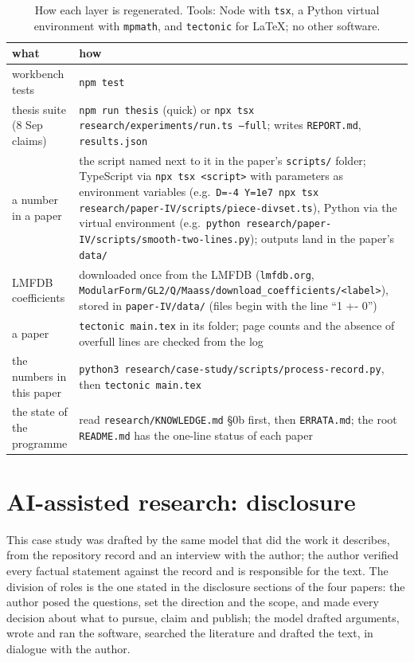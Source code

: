 \documentclass[11pt,a4paper]{article}
\begin{document}
\begin{table}[htbp]
\centering\small
\caption{How each layer is regenerated. Tools: Node with \texttt{tsx}, a Python virtual environment with
\texttt{mpmath}, and \texttt{tectonic} for \LaTeX; no other software.}\label{tab:regen}
\begin{tabular}{@{}>{\raggedright\arraybackslash}p{4.2cm}>{\raggedright\arraybackslash}p{10.4cm}@{}}
\toprule
what & how\\
\midrule
workbench tests & \texttt{npm test}\\
thesis suite (8 Sep claims) & \texttt{npm run thesis} (quick) or \texttt{npx tsx research/experiments/run.ts --full};
writes \texttt{REPORT.md}, \texttt{results.json}\\
a number in a paper & the script named next to it in the paper's \texttt{scripts/} folder; TypeScript via
\texttt{npx tsx <script>} with parameters as environment variables (e.g.\ \texttt{D=-4 Y=1e7 npx tsx
research/paper-IV/scripts/piece-divset.ts}), Python via the virtual environment (e.g.\ \texttt{python
research/paper-IV/scripts/smooth-two-lines.py}); outputs land in the paper's \texttt{data/}\\
LMFDB coefficients & downloaded once from the LMFDB (\texttt{lmfdb.org}, \texttt{ModularForm/GL2/Q/Maass/}\allowbreak\texttt{download\_coefficients/<label>}),
stored in \texttt{paper-IV/data/} (files begin with the line ``1 +- 0'')\\
a paper & \texttt{tectonic main.tex} in its folder; page counts and the absence of overfull lines are checked from the
log\\
the numbers in this paper & \texttt{python3 research/case-study/scripts/process-record.py}, then \texttt{tectonic main.tex}\\
the state of the programme & read \texttt{research/KNOWLEDGE.md} \S0b first, then \texttt{ERRATA.md}; the root
\texttt{README.md} has the one-line status of each paper\\
\bottomrule
\end{tabular}
\end{table}

\section*{AI-assisted research: disclosure}
This case study was drafted by the same model that did the work it describes, from the repository record and an
interview with the author; the author verified every factual statement against the record and is responsible for
the text. The division of roles is the one stated in the disclosure sections of the four papers: the author posed
the questions, set the direction and the scope, and made every decision about what to pursue, claim and publish; the
model drafted arguments, wrote and ran the software, searched the literature and drafted the text, in dialogue with
the author.
\end{document}
